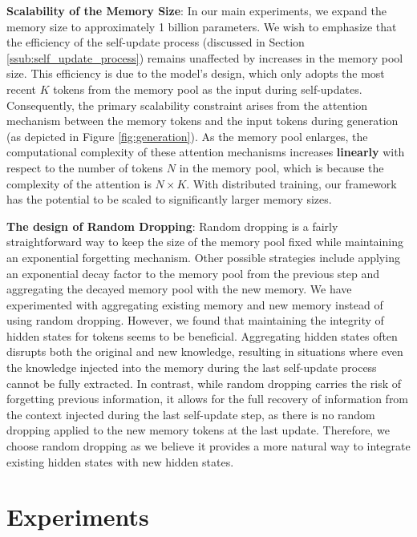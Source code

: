\documentclass{article}
\theoremstyle{plain}
\theoremstyle{definition}
\theoremstyle{remark}
\begin{document}
\textbf{Scalability of the Memory Size}: In our main experiments, we expand the memory size to approximately 1 billion parameters. We wish to emphasize that the efficiency of the self-update process (discussed in Section \ref{ssub:self_update_process}) remains unaffected by increases in the memory pool size. This efficiency is due to the model's design, which only adopts the most recent $K$ tokens from the memory pool as the input during self-updates. Consequently, the primary scalability constraint arises from the attention mechanism between the memory tokens and the input tokens during generation (as depicted in Figure \ref{fig:generation}). As the memory pool enlarges, the computational complexity of these attention mechanisms increases \textbf{linearly} with respect to the number of tokens $N$ in the memory pool, which is because the complexity of the attention is $N\times K$. With distributed training, our framework has the potential to be scaled to significantly larger memory sizes.

\textbf{The design of Random Dropping}: Random dropping is a fairly straightforward way to keep the size of the memory pool fixed while maintaining an exponential forgetting mechanism. 
Other possible strategies include applying an exponential decay factor to the memory pool from the previous step and aggregating the decayed memory pool with the new memory. We have experimented with aggregating existing memory and new memory instead of using random dropping. However, we found that maintaining the integrity of hidden states for tokens seems to be beneficial. Aggregating hidden states often disrupts both the original and new knowledge, resulting in situations where even the knowledge injected into the memory during the last self-update process cannot be fully extracted.
In contrast, while random dropping carries the risk of forgetting previous information, it allows for the full recovery of information from the context injected during the last self-update step, as there is no random dropping applied to the new memory tokens at the last update. Therefore, we choose random dropping as we believe it provides a more natural way to integrate existing hidden states with new hidden states.



\vspace{-5pt}
\section{Experiments}
\vspace{-5pt}
\end{document}
